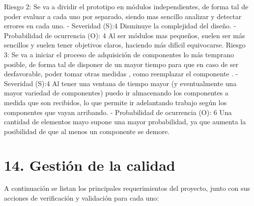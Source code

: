 \documentclass[
11pt, %
codirector, %
]{charter}
\begin{document}
Riesgo 2: Se va a dividir el prototipo en módulos independientes, de forma tal de poder evaluar a cada uno por separado, siendo mas sencillo analizar y detectar errores en cada uno.
  - Severidad (S):4 Disminuye la complejidad del diseño.
  - Probabilidad de ocurrencia (O): 4 Al ser módulos mas pequeños, suelen ser más sencillos y suelen tener objetivos claros, haciendo más difícil equivocarse.
Riesgo 3: Se va a iniciar el proceso de adquisición de componentes lo más temprano posible, de forma tal de disponer de un mayor tiempo para que en caso de ser desfavorable, poder tomar otras medidas , como reemplazar el componente .
  - Severidad (S):4 Al tener una ventana de tiempo mayor (y eventualmente una mayor variedad de componentes) puedo ir almacenando los componentes a medida que son recibidos, lo que permite ir adelantando trabajo según los componentes que vayan arribando.
  - Probabilidad de ocurrencia (O): 6 Una cantidad de elementos mayo supone una mayor probabilidad, ya que aumenta la posibilidad de que al menos un componente se demore.



\section{14. Gestión de la calidad}
\label{sec:calidad}


A continuación  se listan los principales requerimientos del proyecto, junto con sus acciones de verificación y validación para cada uno:
\end{document}
